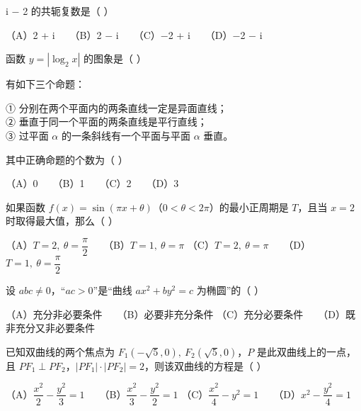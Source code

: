 \begin{question}

i $-$ 2 的共轭复数是（ ）

（A）2 + i　　（B）2 $-$ i　　（C）$-$2 + i　　（D）$-$2 $-$ i

\Needspace{0.4\textheight}
\end{question}
\begin{question}

函数 $y=|\log_2 x|$ 的图象是（ ）
\nopagebreak[4]
\begin{center}\end{center}
\nopagebreak[4]
\end{question}
\begin{question}

有如下三个命题：

① 分别在两个平面内的两条直线一定是异面直线；\\
② 垂直于同一个平面的两条直线是平行直线；\\
③ 过平面 $\alpha$ 的一条斜线有一个平面与平面 $\alpha$ 垂直。

其中正确命题的个数为（ ）

（A）0　　（B）1　　（C）2　　（D）3

\end{question}
\begin{question}

如果函数 $f(x)=\sin(\pi x+\theta)$（$0<\theta<2\pi$）的最小正周期是 $T$，且当 $x=2$ 时取得最大值，那么（ ）

（A）$T=2,\ \theta=\dfrac{\pi}{2}$　　（B）$T=1,\ \theta=\pi$
（C）$T=2,\ \theta=\pi$　　（D）$T=1,\ \theta=\dfrac{\pi}{2}$

\end{question}
\begin{question}

设 $abc\ne 0$，“$ac>0$”是“曲线 $ax^2+by^2=c$ 为椭圆”的（ ）

（A）充分非必要条件　　（B）必要非充分条件
（C）充分必要条件　　（D）既非充分又非必要条件

\end{question}
\begin{question}

已知双曲线的两个焦点为 $F_1(-\sqrt5,0),\ F_2(\sqrt5,0)$，$P$ 是此双曲线上的一点，且 $PF_1\perp PF_2$，$|PF_1|\cdot|PF_2|=2$，则该双曲线的方程是（ ）

（A）$\dfrac{x^2}{2}-\dfrac{y^2}{3}=1$　　（B）$\dfrac{x^2}{3}-\dfrac{y^2}{2}=1$
（C）$\dfrac{x^2}{4}-y^2=1$　　（D）$x^2-\dfrac{y^2}{4}=1$

\end{question}
